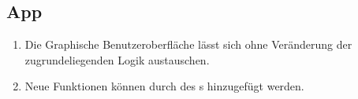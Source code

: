 \subsection{App}

\begin{enumerate}
    \item Die Graphische Benutzeroberfläche lässt sich ohne Veränderung der zugrundeliegenden Logik austauschen.
    \item Neue Funktionen können durch %
        des %
        s hinzugefügt werden.
\end{enumerate}
